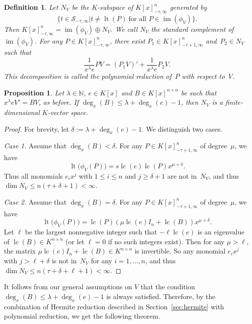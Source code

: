 \documentclass[final,1p,times,authoryear]{elsarticle}
\newtheorem{prop}[theorem]{Proposition}
\newtheorem{defi}[theorem]{Definition}
\newcommand{\cS}{ {\mathcal S}}
\let\set\mathbb
\def\lc{\operatorname{lc}}
\def\lt{\operatorname{lt}}
\def\im{\operatorname{im}}
\begin{document}
\begin{defi}
  Let $N_V$ be the $K$-subspace of $K[x]_{-\tau,\infty}^n$ generated by
\[
  \bigl\{t \in \cS_{-\tau,\infty} \mathrel{\big|} t \neq \lt(P) \ \text{for all $P\in \im(\phi_V)$}\bigr\}.
\]
Then $K[x]_{-\tau,\infty}^n = \im(\phi_V) \oplus N_V$.
We call $N_V$ the \emph{standard complement} of $\im(\phi_V)$.
For any $P\in K[x]_{-\tau,\infty}^n$, there exist $P_1\in K[x]_{-\tau+1,\infty}^n$ and~$P_2\in N_V$ such that
\[\frac{1}{x^\lambda e}PV = (P_1V)' + \frac{1}{x^\lambda e}P_2V.\]
This decomposition is called the \emph{polynomial reduction} of~$P$
with respect to~$V$.
\end{defi}

\begin{prop}\label{PROP:finite}
Let $\lambda\in\set N$, $e\in K[x]$ and $B\in K[x]^{n \times n}$ be such that $x^\lambda eV'=BV$, as before.
If $\deg_x(B) \leq \lambda+\deg_x(e)-1$, then $N_V$ is a finite-dimensional $K$-vector space.
\end{prop}
\begin{proof}
For brevity, let $\delta:=\lambda+\deg_x(e)-1$. We distinguish two cases.

\smallskip
{\it Case 1.}
Assume that $\deg_x(B) < \delta$. For any $P\in K[x]_{-\tau+1,\infty}^n$ of degree~$\mu$, we have
\[
  \lt\bigl(\phi_V(P)\bigr) = s\lc(e)\lc(P)x^{\mu+\delta}.
\]
Thus all monomials $e_i x^j$ with $1\leq i\leq n$ and $j\geq \delta+1$ are not in~$N_V$,
and thus $\dim N_V\leq n(\tau+\delta+1)<\infty$.

\smallskip
{\it Case 2.}
Assume that $\deg_x(B)=\delta$. For any $P\in K[x]_{-\tau+1,\infty}^n$ of degree~$\mu$, we have
\[
  \lt\bigl(\phi_V(P)\bigr) = \lc(P)(\mu\lc(e)I_n + \lc(B))x^{\mu+\delta}.
\]
Let $\ell$ be the largest nonnegative integer such that $-\ell \lc(e)$ is an
eigenvalue of $\lc(B)\in K^{n\times n}$ (or let $\ell=0$ if no such integers exist).
Then for any $\mu>\ell$, the matrix $\mu\lc(e)I_n + \lc(B)\in K^{n\times n}$ is invertible.
So any monomial $e_ix^j$ with $j> \ell+\delta$ is not in~$N_V$ for any $i=1, \ldots, n$,
and thus $\dim N_V\leq n(\tau+\delta+\ell+1)<\infty$.
\end{proof}

It follows from our general assumptions on $V$ that the
condition $\deg_x(B) \leq \lambda+\deg_x(e)-1$ is always satisfied.
Therefore, by the combination of Hermite reduction described in Section~\ref{sec:hermite}
with polynomial reduction, we get the following theorem.

\end{document}
